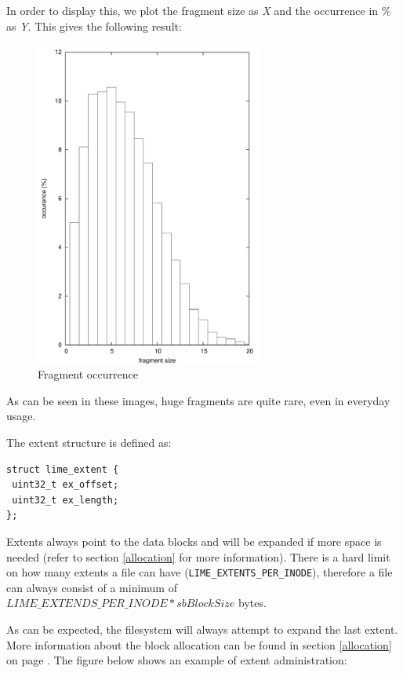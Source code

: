 In order to display this, we plot the fragment size as \emph{X} and the occurrence in \% as \emph{Y}. This gives the following result:

\begin{figure}[h]
\includegraphics[width=7.5cm]{frag-occurence}
\caption{Fragment occurrence}
\end{figure}

As can be seen in these images, huge fragments are quite rare, even in everyday usage.

\standoff

The extent structure is defined as:

\begin{verbatim}
struct lime_extent {
 uint32_t ex_offset;
 uint32_t ex_length;
};
\end{verbatim}

Extents always point to the data blocks and will be expanded if more space is needed (refer to section \ref{allocation} for more information). There is a hard limit on how many extents a file can have (\texttt{LIME\_EXTENTS\_PER\_INODE}), therefore a file can always consist of a minimum of \\
$LIME\_EXTENDS\_PER\_INODE * sbBlockSize$ bytes.

As can be expected, the filesystem will always attempt to expand the last extent. More information about the block allocation can be found in section \ref{allocation} on page \pageref{allocation}. The figure below shows an example of extent administration:

